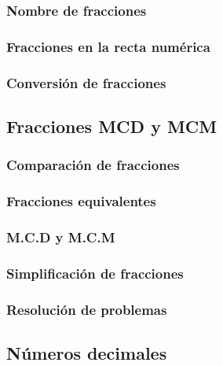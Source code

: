 \documentclass[12pt,addpoints,answers]{evalua}
\begin{document}
\begin{questions}
	\subsubsection{Nombre de fracciones}
	\question[1]{}
	\subsubsection{Fracciones en la recta numérica}
	\question[1]{}
	\subsubsection{Conversión de fracciones}
	\question[1]{}

	\subsection   {Fracciones MCD y MCM}
	\subsubsection{Comparación de fracciones}
	\question[1]{}
	\subsubsection{Fracciones equivalentes}
	\question[1]{}
	\subsubsection{M.C.D y M.C.M}
	\question[1]{}
	\subsubsection{Simplificación de fracciones}
	\question[1]{}
	\subsubsection{Resolución de problemas}
	\question[1]{}

	\subsection   {Números decimales}

\end{questions}
\end{document}
